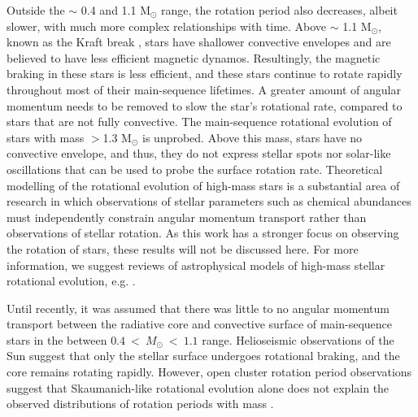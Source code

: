 Outside the $\sim$ 0.4 and 1.1 M$_{\odot}$ range, the rotation period also decreases, albeit slower, with much more complex relationships with time.
Above $\sim$ 1.1 M$_{\odot}$, known as the Kraft break \citep{kraft_studies_1967}, stars have shallower convective envelopes and are believed to have less efficient magnetic dynamos.
Resultingly, the magnetic braking in these stars is less efficient, and these stars continue to rotate rapidly throughout most of their main-sequence lifetimes. 
A greater amount of angular momentum needs to be removed to slow the star's rotational rate, compared to stars that are not fully convective.
The main-sequence rotational evolution of stars with mass $>$1.3 M$_{\odot}$ is unprobed.
Above this mass, stars have no convective envelope, and thus, they do not express stellar spots nor solar-like oscillations that can be used to probe the surface rotation rate.
Theoretical modelling of the rotational evolution of high-mass stars is a substantial area of research in which observations of stellar parameters such as chemical abundances must independently constrain angular momentum transport rather than observations of stellar rotation.
As this work has a stronger focus on observing the rotation of stars, these results will not be discussed here.
For more information, we suggest reviews of astrophysical models of high-mass stellar rotational evolution, e.g. \citet{heger_presupernova_1998,maeder_evolution_2000,maeder_physics_2009}.

Until recently, it was assumed that there was little to no angular momentum transport between the radiative core and convective surface of main-sequence stars in the between $0.4 \ < \ M_{\odot} \  < \ 1.1$ range. 
Helioseismic observations of the Sun suggest that only the stellar surface undergoes rotational braking, and the core remains rotating rapidly.
However, open cluster rotation period observations suggest that Skaumanich-like rotational evolution alone does not explain the observed distributions of rotation periods with mass \citep{spada_competing_2020}.

